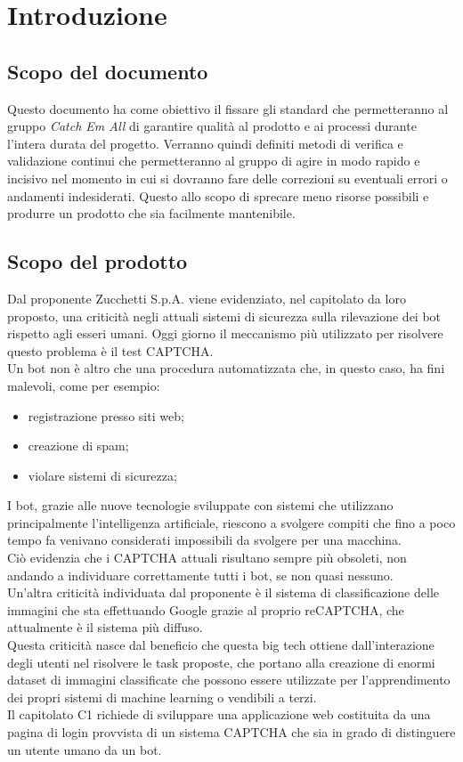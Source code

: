 \section{Introduzione}

\subsection{Scopo del documento}
Questo documento ha come obiettivo il fissare gli standard che permetteranno al gruppo \textit{Catch Em All} di garantire qualità al prodotto e ai processi durante l'intera durata del progetto. Verranno quindi definiti metodi di verifica e validazione continui che permetteranno al gruppo di agire in modo rapido e incisivo nel momento in cui si dovranno fare delle correzioni su eventuali errori o andamenti indesiderati. Questo allo scopo di sprecare meno risorse possibili e produrre un prodotto che sia facilmente mantenibile. 

\subsection{Scopo del prodotto}
Dal proponente Zucchetti S.p.A. viene evidenziato, nel capitolato da loro proposto, una criticità negli attuali sistemi di sicurezza sulla rilevazione dei bot rispetto agli esseri umani. Oggi giorno il meccanismo più utilizzato per risolvere questo problema è il test CAPTCHA.\\
Un bot non è altro che una procedura automatizzata che, in questo caso, ha fini malevoli, come per esempio:
\begin{itemize}
	\item registrazione presso siti web;
	\item creazione di spam;
	\item violare sistemi di sicurezza;
\end{itemize}
I bot, grazie alle nuove tecnologie sviluppate con sistemi che utilizzano principalmente l'intelligenza artificiale, riescono a svolgere compiti che fino a poco tempo fa venivano considerati impossibili da svolgere per una macchina.\\
Ciò evidenzia che i CAPTCHA attuali risultano sempre più obsoleti, non andando a individuare correttamente tutti i bot, se non quasi nessuno.\\
Un'altra criticità individuata dal proponente è il sistema di classificazione delle immagini che sta effettuando Google grazie al proprio reCAPTCHA, che attualmente è il sistema più diffuso.\\
Questa criticità nasce dal beneficio che questa big tech ottiene dall'interazione degli utenti nel risolvere le task proposte, che portano alla creazione di enormi dataset di immagini classificate che possono essere utilizzate per l'apprendimento dei propri sistemi di machine learning o vendibili a terzi.\\
Il capitolato C1 richiede di sviluppare una applicazione web costituita da una pagina di login provvista di un sistema CAPTCHA che sia in grado di distinguere un utente umano da un bot.\\


